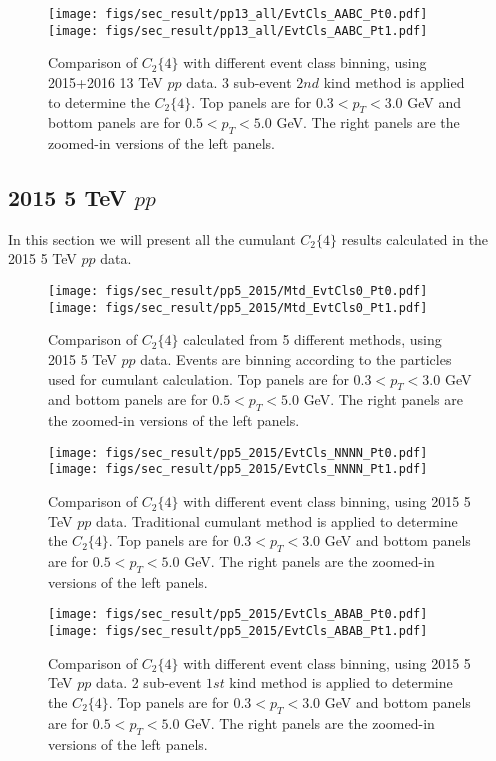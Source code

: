\begin{figure}[H]
\centering
\texttt{[image: figs/sec\_result/pp13\_all/EvtCls\_AABC\_Pt0.pdf]}
\texttt{[image: figs/sec\_result/pp13\_all/EvtCls\_AABC\_Pt1.pdf]}
\caption{Comparison of $C_{2}\{4\}$ with different event class binning, using 2015+2016 13 TeV $pp$ data. 3 sub-event $2nd$ kind method is applied to determine the $C_{2}\{4\}$. Top panels are for $0.3<p_{T}<3.0$ GeV and bottom panels are for $0.5<p_{T}<5.0$ GeV. The right panels are the zoomed-in versions of the left panels.}
\label{fig:result_pp13_all_EvtCls_AABC}
\end{figure}




\subsection{2015 5 TeV $pp$}
In this section we will present all the cumulant $C_{2}\{4\}$ results calculated in the 2015 5 TeV $pp$ data.

\begin{figure}[H]
\centering
\texttt{[image: figs/sec\_result/pp5\_2015/Mtd\_EvtCls0\_Pt0.pdf]}
\texttt{[image: figs/sec\_result/pp5\_2015/Mtd\_EvtCls0\_Pt1.pdf]}
\caption{Comparison of $C_{2}\{4\}$ calculated from 5 different methods, using 2015 5 TeV $pp$ data. Events are binning according to the particles used for cumulant calculation. Top panels are for $0.3<p_{T}<3.0$ GeV and bottom panels are for $0.5<p_{T}<5.0$ GeV. The right panels are the zoomed-in versions of the left panels.}
\label{fig:result_pp5_2015_Mtd_EvtCls0}
\end{figure}

\begin{figure}[H]
\centering
\texttt{[image: figs/sec\_result/pp5\_2015/EvtCls\_NNNN\_Pt0.pdf]}
\texttt{[image: figs/sec\_result/pp5\_2015/EvtCls\_NNNN\_Pt1.pdf]}
\caption{Comparison of $C_{2}\{4\}$ with different event class binning, using 2015 5 TeV $pp$ data. Traditional cumulant method is applied to determine the $C_{2}\{4\}$. Top panels are for $0.3<p_{T}<3.0$ GeV and bottom panels are for $0.5<p_{T}<5.0$ GeV. The right panels are the zoomed-in versions of the left panels.}
\label{fig:result_pp5_2015_EvtCls_NNNN}
\end{figure}

\begin{figure}[H]
\centering
\texttt{[image: figs/sec\_result/pp5\_2015/EvtCls\_ABAB\_Pt0.pdf]}
\texttt{[image: figs/sec\_result/pp5\_2015/EvtCls\_ABAB\_Pt1.pdf]}
\caption{Comparison of $C_{2}\{4\}$ with different event class binning, using 2015 5 TeV $pp$ data. 2 sub-event $1st$ kind method is applied to determine the $C_{2}\{4\}$. Top panels are for $0.3<p_{T}<3.0$ GeV and bottom panels are for $0.5<p_{T}<5.0$ GeV. The right panels are the zoomed-in versions of the left panels.}
\label{fig:result_pp5_2015_EvtCls_ABAB}
\end{figure}

